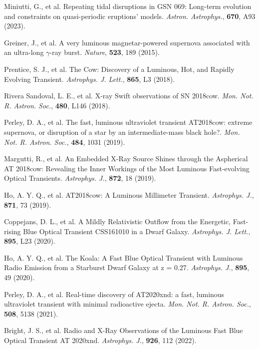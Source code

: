 \documentclass{nature_plusfigure}
\newcommand{\mn}{{Mon. Not. R. Astron. Soc.}}
\newcommand{\mnras}{\mn}
\newcommand{\apj}{{Astrophys. J.}}
\newcommand{\apjl}{{Astrophys. J. Lett.}}
\newcommand{\aap}{{Astron. Astrophys.}}
\newcommand{\nat}{{Nature}}
\begin{document}
\begin{thebibliography}{100}
 Miniutti, G., et al. Repeating tidal disruptions in GSN 069: Long-term evolution and constraints on quasi-periodic eruptions' models. \emph{\aap}, \textbf{670}, A93 (2023). 


 Greiner, J., et al. A very luminous magnetar-powered supernova associated with an ultra-long $\gamma$-ray burst. \emph{\nat}, \textbf{523}, 189 (2015). 

 Prentice, S. J., et al. The Cow: Discovery of a Luminous, Hot, and Rapidly Evolving Transient. \emph{\apjl}, \textbf{865}, L3 (2018). 

  Rivera Sandoval, L. E., et al. X-ray Swift observations of SN 2018cow. \emph{\mnras}, \textbf{480}, L146 (2018). 

 Perley, D. A., et al. The fast, luminous ultraviolet transient AT2018cow: extreme supernova, or disruption of a star by an intermediate-mass black hole?. \emph{\mnras}, \textbf{484}, 1031 (2019). 

 Margutti, R., et al. An Embedded X-Ray Source Shines through the Aspherical AT 2018cow: Revealing the Inner Workings of the Most Luminous Fast-evolving Optical Transients. \emph{\apj}, \textbf{872}, 18 (2019). 

 Ho, A. Y. Q., et al. AT2018cow: A Luminous Millimeter Transient. \emph{\apj}, \textbf{871}, 73 (2019). 


 Coppejans, D. L., et al. A Mildly Relativistic Outflow from the Energetic, Fast-rising Blue Optical Transient CSS161010 in a Dwarf Galaxy. \emph{\apjl}, \textbf{895}, L23 (2020). 

 Ho, A. Y. Q., et al. The Koala: A Fast Blue Optical Transient with Luminous Radio Emission from a Starburst Dwarf Galaxy at z = 0.27. \emph{\apj}, \textbf{895}, 49 (2020). 

 Perley, D. A., et al. Real-time discovery of AT2020xnd: a fast, luminous ultraviolet transient with minimal radioactive ejecta. \emph{\mnras}, \textbf{508}, 5138 (2021). 

  Bright, J. S., et al. Radio and X-Ray Observations of the Luminous Fast Blue Optical Transient AT 2020xnd. \emph{\apj}, \textbf{926}, 112 (2022). 


\end{thebibliography}
\end{document}
